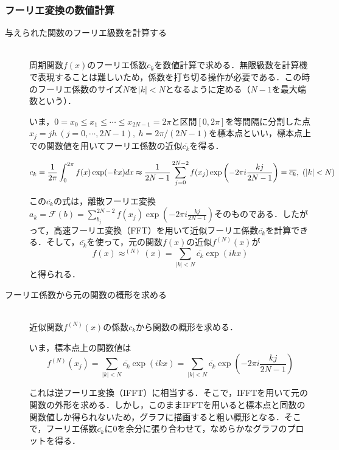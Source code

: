 \documentclass[11pt,a4paper]{jsarticle}
\theoremstyle{definition}
\begin{document}
\subsubsection{フーリエ変換の数値計算}
\begin{description}
  \item[与えられた関数のフーリエ級数を計算する]
    \quad\\
    周期関数$f(x)$のフーリエ係数$c_k$を数値計算で求める．無限級数を計算機で表現することは難しいため，係数を打ち切る操作が必要である．この時のフーリエ係数のサイズ$N$を$|k|<N$となるように定める（$N-1$を最大端数という）．

    いま，$0=x_0\leq x_1 \leq \cdots \leq x_{2N-1}=2\pi$と区間$[0,2\pi]$を等間隔に分割した点$x_j=jh\ (j=0,\cdots,2N-1),\ h=2\pi / (2N-1)$を標本点といい，標本点上での関数値を用いてフーリエ係数の近似$\overline{c_k}$を得る．

    \begin{equation*}
      c_k = \frac{1}{2\pi} \int_{0}^{2\pi} f(x) \exp(-kx) dx \thickapprox \frac{1}{2N-1} \sum_{j=0}^{2N-2} f(x_j) \exp\left(-2\pi i \frac{kj}{2N-1}\right) = \overline{c_k},\ (|k|<N)
    \end{equation*}

    この$\overline{c_k}$の式は，離散フーリエ変換$a_k=\mathcal{F}(b)=\sum_{b_j}^{2N-2} f(x_j) \exp\left(-2\pi i \frac{kj}{2N-1}\right)$そのものである．したがって，高速フーリエ変換（FFT）を用いて近似フーリエ係数$\overline{c_k}$を計算できる．そして，$\overline{c_k}$を使って，元の関数$f(x)$の近似$f^{(N)}(x)$が
    \begin{equation*}
      f(x) \approx ^{(N)}(x) = \sum_{|k|<N} \overline{c_k} \exp(ikx)
    \end{equation*}
    と得られる．

  \item[フーリエ係数から元の関数の概形を求める]
    \quad\\
    近似関数$f^{(N)}(x)$の係数$c_k$から関数の概形を求める．

    いま，標本点上の関数値は
    \begin{equation*}
      f^{(N)}(x_j) = \sum_{|k|<N} \overline{c_k} \exp(ikx) = \sum_{|k|<N} \overline{c_k} \exp\left(-2\pi i \frac{kj}{2N-1}\right)
    \end{equation*}

    これは逆フーリエ変換（IFFT）に相当する．そこで，IFFTを用いて元の関数の外形を求める．しかし，このままIFFTを用いると標本点と同数の関数値しか得られないため，グラフに描画すると粗い概形となる．そこで，フーリエ係数$\overline{c_k}$に0を余分に張り合わせて，なめらかなグラフのプロットを得る．



\end{description}
\end{document}
